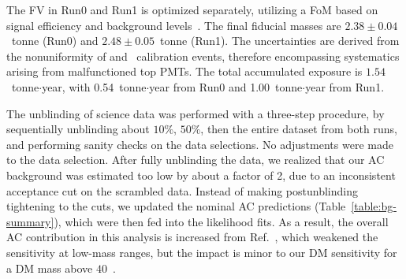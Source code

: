 \documentclass[%
 reprint,
superscriptaddress,
 amsmath,amssymb,
 aps,
 prl,
]{revtex4-1}
\begin{document}
The FV in Run0 and Run1 is optimized separately, utilizing a FoM based on signal efficiency and background levels~\cite{Cowan2012_DiscoverySF}.
The final fiducial masses are $2.38 \pm 0.04$~tonne (Run0) and $2.48 \pm 0.05$~tonne (Run1).
The uncertainties are derived from the nonuniformity of  and \, calibration events, therefore encompassing systematics arising from malfunctioned top PMTs.
The total accumulated exposure is $1.54$~tonne$\cdot$year, with 0.54~tonne$\cdot$year from Run0 and 1.00~tonne$\cdot$year from Run1.

The unblinding of science data was performed with a three-step procedure, by sequentially unblinding about $10\%$, $50\%$, then the entire dataset from both runs, and performing sanity checks on the data selections.
No adjustments were made to the data selection. 
After fully unblinding the data, we realized that our AC background was estimated too low by about a factor of 2, due to an inconsistent acceptance cut on the scrambled data.
Instead of making postunblinding tightening to the cuts, we updated the nominal AC predictions (Table~\ref{table:bg-summary}), which were then fed into the likelihood fits.
As a result, the overall AC contribution in this analysis is increased from Ref.~\cite{Meng2021_P4First}, which weakened the sensitivity at low-mass ranges, but the impact is minor to our DM sensitivity for a DM mass above $40$~\GeV. 
\end{document}
